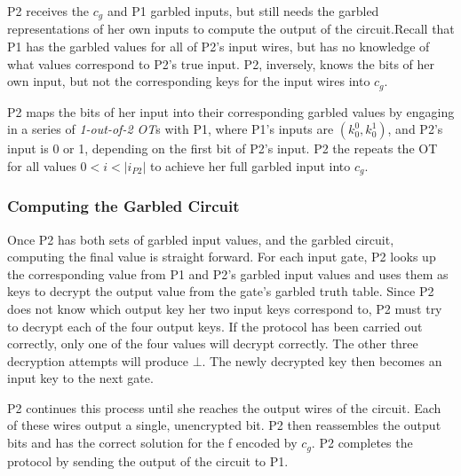 \ac{P2} receives the $c_g$ and \ac{P1} garbled inputs, but still needs the garbled representations of her own inputs to compute the output of the circuit.Recall that \ac{P1} has the garbled values for all of \ac{P2}'s input wires, but has no knowledge of what values correspond to \ac{P2}'s true input.  \ac{P2}, inversely, knows the bits of her own input, but not the corresponding keys for the input wires into $c_g$.

\ac{P2} maps the bits of her input into their corresponding garbled values by engaging in a series of \emph{1-out-of-2 \ac{OT}}s with \ac{P1}, where \ac{P1}'s inputs are $(k^0_0, k^1_0)$, and \ac{P2}'s input is 0 or 1, depending on the first bit of \ac{P2}'s input.  \ac{P2} the repeats the \ac{OT} for all values $0 < i < |i_{P2}|$ to achieve her full garbled input into $c_g$.

\subsubsection{Computing the Garbled Circuit}

Once \ac{P2} has both sets of garbled input values, and the garbled circuit, computing the final value is straight forward.  For each input gate, \ac{P2} looks up the corresponding value from \ac{P1} and \ac{P2}'s garbled input values and uses them as keys to decrypt the output value from the gate's garbled truth table.  Since \ac{P2} does not know which output key her two input keys correspond to, \ac{P2} must try to decrypt each of the four output keys.  If the protocol has been carried out correctly, only one of the four values will decrypt correctly.  The other three decryption attempts will produce $\bot$. The newly decrypted key then becomes an input key to the next gate.

\ac{P2} continues this process until she reaches the output wires of the circuit.  Each of these wires output a single, unencrypted bit.  \ac{P2} then reassembles the output bits and has the correct solution for the \ac{f} encoded by $c_g$.  \ac{P2} completes the protocol by sending the output of the circuit to \ac{P1}.
